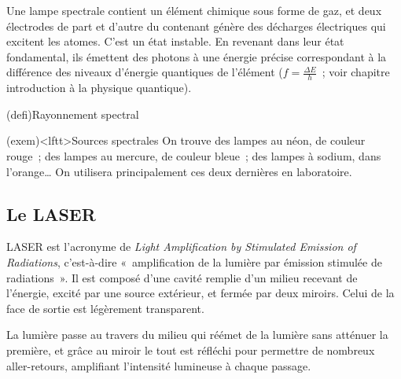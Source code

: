 \documentclass[../../main/main.tex]{subfiles}
\begin{document}
Une lampe spectrale contient un élément chimique sous forme de gaz, et deux
électrodes de part et d'autre du contenant génère des décharges électriques qui
excitent les atomes. C'est un état instable. En revenant dans leur état
fondamental, ils émettent des photons à une énergie précise correspondant à la
différence des niveaux d'énergie quantiques de l'élément ($f = \frac{\Delta
		E}{h}$~; voir chapitre introduction à la physique quantique).

\begin{tcb*}(defi){Rayonnement spectral}
\end{tcb*}
\begin{tcb}[sidebyside, righthand width=.5\linewidth](exem)<lftt>{Sources spectrales}
	On trouve des lampes au néon, de couleur rouge~; des lampes au mercure, de
	couleur bleue~; des lampes à sodium, dans l'orange… On utilisera
	principalement ces deux dernières en laboratoire.
	\tcblower
	\begin{center}
		\pgfspectra[element=Hg,
		axis, axis color=white, axis font color=black,
		axis ticks=4, axis unit precision=2,
		axis label text={Longueur d'onde [$\si{nm}$]},
		back=white,
		label, label position=north west,
		label before text=Spectre d'émission de~,
		label after text=\ :]
		\label{fig:lamp_spec}
	\end{center}
\end{tcb}

\subsection{Le LASER}
LASER est l'acronyme de \textit{Light Amplification by Stimulated Emission of
	Radiations}, c'est-à-dire «~amplification de la lumière par émission stimulée de
radiations~». Il est composé d'une cavité remplie d'un milieu recevant de
l'énergie, excité par une source extérieur, et fermée par deux miroirs. Celui de
la face de sortie est légèrement transparent.

La lumière passe au travers du milieu qui réémet de la lumière sans atténuer la
première, et grâce au miroir le tout est réfléchi pour permettre de nombreux
aller-retours, amplifiant l'intensité lumineuse à chaque passage.
\end{document}
